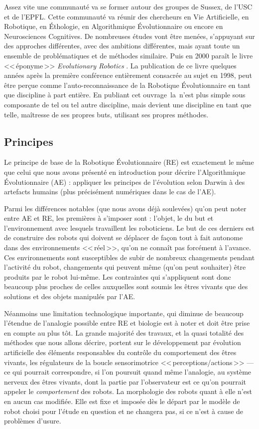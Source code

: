 Assez vite une communauté va se former autour des groupes de Sussex, de l'USC et de l'EPFL. Cette communauté va réunir des chercheurs en Vie Artificielle, en Robotique, en \'Ethologie, en Algorithmique \'Evolutionnaire ou encore en Neurosciences Cognitives. De nombreuses études vont être menées, s'appuyant sur des approches différentes, avec des ambitions différentes, mais ayant toute un ensemble de problématiques et de méthodes similaire. Puis en 2000 paraît le livre <<\,éponyme\,>> \emph{Evolutionary Robotics} \citep{nolfi00evolrobobiolintetechselfmach}. La publication de ce livre quelques années après la première conférence entièrement consacrée au sujet en 1998, peut être perçue comme l'auto-reconnaissance de la Robotique \'Evolutionnaire en tant que discipline à part entière. En publiant cet ouvrage la n'est plus simple sous composante de tel ou tel autre discipline, mais devient une discipline en tant que telle, maîtresse de ses propres buts, utilisant ses propres méthodes.

\subsection{Principes}

Le principe de base de la Robotique \'Evolutionnaire (RE) est exactement le même que celui que nous avons présenté en introduction pour décrire l'Algorithmique \'Evolutionnaire (AE) : appliquer les principes de l'évolution selon Darwin à des artefacts humains (plus précisément numériques dans le cas de l'AE).

Parmi les différences notables (que nous avons déjà soulevées) qu'on peut noter entre AE et RE, les premières à s'imposer sont : l'objet, le du but et l'environnement avec lesquels travaillent les roboticiens. Le but de ces derniers est de construire des robots qui doivent se déplacer de façon tout à fait autonome dans des environnements <<\,réel\,>>, qu'on ne connaît pas forcément à l'avance. Ces environnements sont susceptibles de subir de nombreux changements pendant l'activité du robot, changements qui peuvent même (qu'on peut souhaiter) être produits par le robot lui-même. Les contraintes qui s'appliquent sont donc beaucoup plus proches de celles auxquelles sont soumis les êtres vivants que des solutions et des objets manipulés par l'AE.

Néanmoins une limitation technologique importante, qui diminue de beaucoup l'étendue de l'analogie possible entre RE et biologie est à noter et doit être prise en compte au plus tôt. La grande majorité des travaux, et la quasi totalité des méthodes que nous allons décrire, portent sur le développement par évolution artificielle des éléments responsables du contrôle du comportement des êtres vivants, les régulateurs de la boucle sensorimotrice <<\,perceptions/actions\,>> ---ce qui pourrait correspondre, si l'on poursuit quand même l'analogie, au système nerveux des êtres vivants, dont la partie par l'observateur est ce qu'on pourrait appeler le \emph{comportement} des robots. La morphologie des robots quant à elle n'est en aucun cas modifiée. Elle est fixe et imposée dès le départ par le modèle de robot choisi pour l'étude en question et ne changera pas, si ce n'est à cause de problèmes d'usure.

